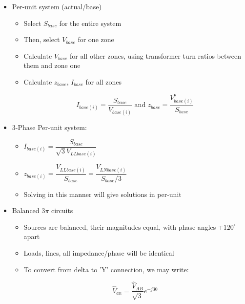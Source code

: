 \begin{itemize}
  \item Per-unit system (actual/base)

    \begin{itemize}

      \item Select $S_{base}$ for the entire system

      \item Then, select $V_{base}$ for one zone

      \item Calculate $V_{base}$ for all other zones, using transformer turn ratios between them and zone one
        
      \item Calculate $z_{base}$, $I_{base}$ for all zones

        $$I_{base(i)}=\frac{S_{base}}{V_{base(i)}}\text{ and }z_{base}=\frac{V^{2}_{base(i)}}{S_{base}}$$

    \end{itemize}

  \item 3-Phase Per-unit system:

    \begin{itemize}

      \item $I_{base(i)}=\dfrac{S_{base}}{\sqrt{3}V_{LLbase(i)}}$

      \item $z_{base(i)}=\dfrac{V_{LLbase(i)}}{S_{base}}=\dfrac{V_{LNbase(i)}}{S_{base}/3}$

      \item Solving in this manner will give solutions in per-unit

    \end{itemize}

  \item Balanced $3\pi$ circuits

    \begin{itemize}

      \item Sources are balanced, their magnitudes equal, with phase angles $\mp120^{\circ}$ apart

      \item Loads, lines, all impedance/phase will be identical

      \item To convert from delta to 'Y' connection, we may write:

        $$\hat{V}_{an}=\frac{\hat{V}_{AB}}{\sqrt{3}}e^{-j30}$$


\end{itemize}
\end{itemize}

